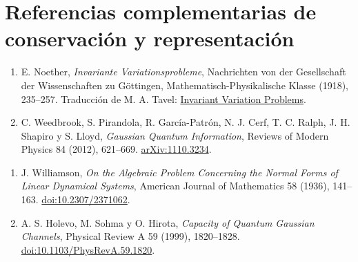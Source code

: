 \section*{Referencias complementarias de conservación y representación}
\begin{enumerate}
\item E. Noether, \emph{Invariante Variationsprobleme}, Nachrichten von der Gesellschaft der Wissenschaften zu Göttingen, Mathematisch-Physikalische Klasse (1918), 235--257. Traducción de M. A. Tavel: \href{https://arxiv.org/abs/physics/0503066}{Invariant Variation Problems}.
\item C. Weedbrook, S. Pirandola, R. García-Patrón, N. J. Cerf, T. C. Ralph, J. H. Shapiro y S. Lloyd, \emph{Gaussian Quantum Information}, Reviews of Modern Physics 84 (2012), 621--669. \href{https://arxiv.org/abs/1110.3234}{arXiv:1110.3234}.
\end{enumerate}
\begin{enumerate}[resume]
\item J. Williamson, \emph{On the Algebraic Problem Concerning the Normal Forms of Linear Dynamical Systems}, American Journal of Mathematics 58 (1936), 141--163. \href{https://doi.org/10.2307/2371062}{doi:10.2307/2371062}.
\item A. S. Holevo, M. Sohma y O. Hirota, \emph{Capacity of Quantum Gaussian Channels}, Physical Review A 59 (1999), 1820--1828. \href{https://doi.org/10.1103/PhysRevA.59.1820}{doi:10.1103/PhysRevA.59.1820}.
\end{enumerate}
